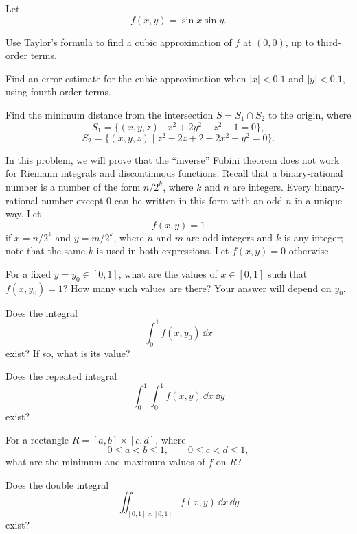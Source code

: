 \begin{problem}
Let
\[
f(x, y)=\sin x\sin y.
\]
\begin{problemsubparts}
\item Use Taylor's formula to find a cubic approximation of $f$ at $(0, 0)$, up to third-order terms.
\item Find an error estimate for the cubic approximation when $|x|<0.1$ and $|y|<0.1$, using fourth-order terms.
\end{problemsubparts}
\end{problem}

\begin{problem}
Find the minimum distance from the intersection $S=S_1\cap S_2$ to the origin, where
\[
S_1=\{(x, y, z)\mid x^2+2y^2-z^2-1=0\},
\]
\[
S_2=\{(x, y, z)\mid z^2-2z+2-2x^2-y^2=0\}.
\]
\end{problem}

\begin{problem}
In this problem, we will prove that the ``inverse'' Fubini theorem does not work for Riemann integrals and discontinuous functions. Recall that a binary-rational number is a number of the form $n/2^k$, where $k$ and $n$ are integers. Every binary-rational number except $0$ can be written in this form with an odd $n$ in a unique way. Let
\[
f(x, y)=1
\]
if $x=n/2^k$ and $y=m/2^k$, where $n$ and $m$ are odd integers and $k$ is any integer; note that the same $k$ is used in both expressions. Let $f(x, y)=0$ otherwise.
\begin{problemsubparts}
\item For a fixed $y=y_0\in[0, 1]$, what are the values of $x\in[0, 1]$ such that $f(x, y_0)=1$? How many such values are there? Your answer will depend on $y_0$.

Does the integral
\[
\int_0^1 f(x, y_0)\,\dd x
\]
exist? If so, what is its value?

Does the repeated integral
\[
\int_0^1\int_0^1 f(x, y)\,\dd x\,\dd y
\]
exist?
\item For a rectangle $R=[a, b]\times[c, d]$, where
\[
0\le a<b\le1,
\qquad
0\le c<d\le1,
\]
what are the minimum and maximum values of $f$ on $R$?

Does the double integral
\[
\iint_{[0, 1]\times[0, 1]} f(x, y)\,\dd x\,\dd y
\]
exist?
\end{problemsubparts}
\end{problem}

